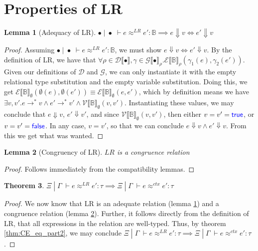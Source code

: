 \documentclass[twoside,11pt,openright]{report}
\newtheorem{theorem}{Theorem}
\newtheorem{lemma}[theorem]{Lemma}
\theoremstyle{definition}
\newcommand{\Keyword}[1]{{\color{blue} \mathsf{#1}}}
\newcommand{\expr}{e}
\newcommand{\val}{v}
\newcommand{\True}{\Keyword{true}}
\newcommand{\False}{\Keyword{false}}
\newcommand{\Tbool}{\mathbb{B}}
\newcommand{\typ}{\tau}
\newcommand{\venv}{\Gamma}
\newcommand{\tenv}{\Xi}
\newcommand{\emptenv}{\bullet}
\newcommand{\empvenv}{\bullet}
\newcommand{\jdgRel}[6]{#1 \; | \; #2 \; \vdash #3 \approx^{#4} #5 : #6}
\newcommand{\ctxRel}[5]{\jdgRel{#1}{#2}{#3}{ctx}{#4}{#5}}
\newcommand{\stepS}{\rightarrow^*}
\newcommand{\ValInp}[2]{\mathcal{V} \llbracket #1 \rrbracket_{#2}}
\newcommand{\ExpInp}[2]{\mathcal{E} \llbracket #1 \rrbracket_{#2}}
\newcommand{\VenvInp}[2]{\mathcal{G} \llbracket #1 \rrbracket_{#2}}
\newcommand{\TenvInp}[1]{\mathcal{D} \llbracket #1 \rrbracket}
\newcommand{\LogRel}[5]{\jdgRel{#1}{#2}{#3}{LR}{#4}{#5}}
\begin{document}
\section{Properties of LR}

\begin{lemma}[Adequacy of LR]\label{lem:LR_adeq}
  $\LogRel{\emptenv}{\empvenv}{\expr}{\expr'}{\Tbool} \implies \expr \Downarrow \val \iff \expr' \Downarrow \val$
\end{lemma}
\begin{proof}
  Assuming $\LogRel{\emptenv}{\empvenv}{\expr}{\expr'}{\Tbool}$, we must show 
  $\expr \Downarrow \val \iff \expr' \Downarrow \val$. By the definition of LR, we have that $\forall \rho \in \TenvInp{\emptenv}, \gamma \in \VenvInp{\empvenv}{\rho} . \ExpInp{\Tbool}{\rho}(\gamma_1(\expr), \gamma_2(\expr'))$. Given our definitions of $\mathcal{D}$ and $\mathcal{G}$, we can only instantiate it with the empty relational type substitution and the empty variable substitution. Doing this, we get $\ExpInp{\Tbool}{\emptyset}(\emptyset(\expr), \emptyset(\expr')) \equiv \ExpInp{\Tbool}{\emptyset}(\expr, \expr')$, which by definition means we have $\exists \val, \val' . \expr \stepS \val \land \expr' \stepS \val' \land \ValInp{\Tbool}{\emptyset}(\val, \val')$. Instantiating these values, we may conclude that $\expr \Downarrow \val$, $\expr' \Downarrow \val'$, and since $\ValInp{\Tbool}{\emptyset}(\val, \val')$, then either $\val = \val' = \True$, or $\val = \val' = \False$. In any case, $\val = \val'$, so that we can conclude $\expr \Downarrow \val \land \expr' \Downarrow \val$. From this we get what was wanted.
\end{proof}

\begin{lemma}[Congruency of LR]\label{lem:LR_cong}
  $LR$ is a congruence relation
\end{lemma}
\begin{proof}
  Follows immediately from the compatibility lemmas.
\end{proof}

\begin{theorem}\label{thm:LR_sound}
  $\LogRel{\tenv}{\venv}{\expr}{\expr'}{\typ} \implies \ctxRel{\tenv}{\venv}{\expr}{\expr'}{\typ}$
\end{theorem}
\begin{proof}
  We now know that LR is an adequate relation (lemma \ref{lem:LR_adeq}) and a congruence relation (lemma \ref{lem:LR_cong}). Further, it follows directly from the definition of LR, that all expressions in the relation are well-typed. Thus, by theorem \ref{thm:CE_eq_part2}, we may conclude $\LogRel{\tenv}{\venv}{\expr}{\expr'}{\typ} \implies \ctxRel{\tenv}{\venv}{\expr}{\expr'}{\typ}$.
\end{proof}
\end{document}
